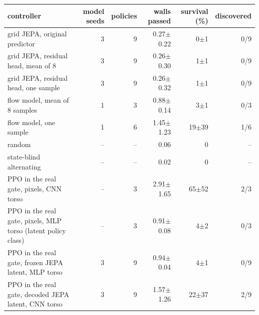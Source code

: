 \begin{tabular}{lrrrrr}
\toprule
controller & model seeds & policies & walls passed & survival (\%) & discovered \\
\midrule
grid JEPA, original predictor & 3 & 9 & 0.27$\pm$0.22 & 0$\pm$1 & 0/9 \\
grid JEPA, residual head, mean of 8 & 3 & 9 & 0.26$\pm$0.30 & 1$\pm$1 & 0/9 \\
grid JEPA, residual head, one sample & 3 & 9 & 0.26$\pm$0.32 & 1$\pm$1 & 0/9 \\
flow model, mean of 8 samples & 1 & 3 & 0.88$\pm$0.14 & 3$\pm$1 & 0/3 \\
flow model, one sample & 1 & 6 & 1.45$\pm$1.23 & 19$\pm$39 & 1/6 \\
random & -- & -- & 0.06 & 0 & -- \\
state-blind alternating & -- & -- & 0.02 & 0 & -- \\
PPO in the real gate, pixels, CNN torso & -- & 3 & 2.91$\pm$1.65 & 65$\pm$52 & 2/3 \\
PPO in the real gate, pixels, MLP torso (latent policy class) & -- & 3 & 0.91$\pm$0.08 & 4$\pm$2 & 0/3 \\
PPO in the real gate, frozen JEPA latent, MLP torso & 3 & 9 & 0.94$\pm$0.04 & 4$\pm$1 & 0/9 \\
PPO in the real gate, decoded JEPA latent, CNN torso & 3 & 9 & 1.57$\pm$1.26 & 22$\pm$37 & 2/9 \\
\bottomrule
\end{tabular}

